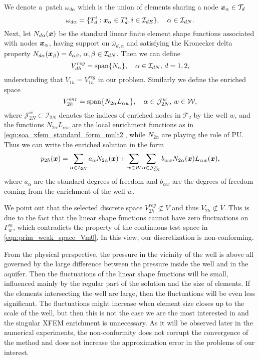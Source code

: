 We denote a~patch $\omega_{d\alpha}$ which is the union of elements sharing a node $\mathbf{\boldsymbol{x}}_\alpha\in\mathcal{T}_d$
\[
    \omega_{d\alpha} = \{ T_d^i: \mathbf{\boldsymbol{x}}_\alpha \in T_d^i, i\in\mathcal{I}_{dE}\}, \quad \alpha\in\mathcal{I}_{dN}.
\]
Next, let $N_{d \alpha}(\mathbf{\boldsymbol{x}})$ be the standard linear finite element shape functions associated with
nodes $\mathbf{\boldsymbol{x}}_\alpha$, having support on $\overbar\omega_{d,\alpha}$ and satisfying the Kronecker delta property
$N_{d \alpha}(\mathbf{\boldsymbol{x}}_\beta)=\delta_{\alpha\beta},\, \alpha,\beta\in\mathcal{I}_{dN}$.
Then we can define
\begin{equation}
    V_{dh}^{reg} = \textrm{span}\{N_\alpha\}, \quad \alpha\in\mathcal{I}_{dN},\, d=1,2,
\end{equation}
understanding that $V_{1h} = V_{1h}^{reg}$ in our problem.
Similarly we define the enriched space
\begin{equation}
    V_{2h}^{enr} = \textrm{span}\{N_{2\alpha} L_{\alpha w}\}, \quad \alpha\in\mathcal{J}^w_{2N},\, w\in\mathcal{W},
\end{equation}
where $\mathcal{J}^w_{2N}\subset\mathcal{I}_{2N}$ denotes the indices of enriched nodes in $\mathcal{T}_2$ 
by the well $w$, and
the functions $N_{2\alpha}L_{\alpha w}$ are the local enrichment functions as in \eqref{eqn:soa_xfem_standard_form_mult2},
while $N_{2\alpha}$ are playing the role of PU.
Thus we can write the enriched solution in the form
\begin{equation} \label{eqn:prim_xfem_standard_form}
  p_{2h}(\mathbf{\boldsymbol{x}}) = \sum_{\alpha\in\mathcal{I}_{2N}}a_\alpha N_{2\alpha}(\mathbf{\boldsymbol{x}})
    + \sum_{w\in\mathcal{W}} \sum_{\alpha\in\mathcal{J}^w_{2N}} b_{\alpha w} N_{2\alpha}(\mathbf{\boldsymbol{x}}) L_{\alpha w}(\mathbf{\boldsymbol{x}}),
\end{equation}
where $a_\alpha$ are the standard degrees of freedom and $b_{\alpha w}$ are the degrees of freedom coming from
the enrichment of the well $w$.

We point out that the selected discrete space $V^{reg}_{2h} \not\subset V$ and thus $V_{2h} \not\subset V$.
This is due to the fact that the linear shape functions cannot have zero fluctuations on $\Gamma^m_w$,
which contradicts the property of the continuous test space in \eqref{eqn:prim_weak_space_Vm0}.
In this view, our discretization is non-conforming.

From the physical perspective, the pressure in the vicinity of the well is above all governed by the large difference between the pressure inside the well and in the aquifer.
Then the fluctuations of the linear shape functions will be small, influenced mainly by the regular part of the solution and the size of elements.
If the elements intersecting the well are large, then the fluctuations will be even less significant.
The fluctuations might increase when element size closes up to the scale of the well, but then this is not the case
we are the most interested in and the singular XFEM enrichment is unnecessary.
As it will be observed later in the numerical experiments, the non-conformity does not corrupt
the convergence of the method and does not increase the approximation error in the problems of our interest.

